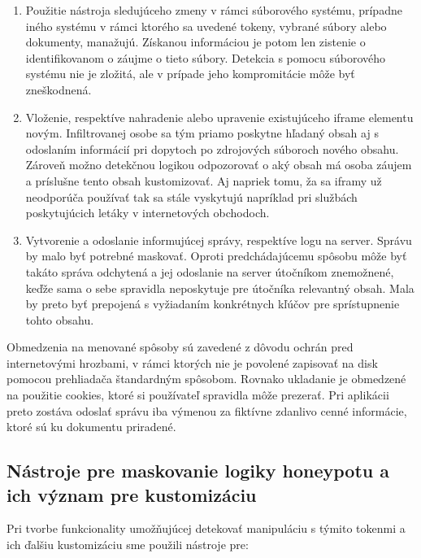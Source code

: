 \documentclass[conference, 11pt,slovak,a4paper,twoside]{IEEEtran}
\begin{document}
\begin{enumerate}
	\item Použitie nástroja sledujúceho zmeny v rámci súborového systému, prípadne iného systému v rámci ktorého sa uvedené tokeny, vybrané súbory alebo dokumenty, manažujú. Získanou informáciou je potom len zistenie o identifikovanom o záujme o tieto súbory. Detekcia s pomocu súborového systému nie je zložitá, ale v prípade jeho kompromitácie môže byť zneškodnená.
	
	\item Vloženie, respektíve nahradenie alebo upravenie existujúceho iframe elementu novým. Infiltrovanej osobe sa tým priamo poskytne hľadaný obsah aj s odoslaním informácií pri dopytoch po zdrojových súboroch nového obsahu. Zároveň možno detekčnou logikou odpozorovať o aký obsah má osoba záujem a príslušne tento obsah kustomizovať. Aj napriek tomu, ža sa iframy už neodporúča používať tak sa stále vyskytujú napríklad pri službách poskytujúcich letáky v internetových obchodoch.

	\item Vytvorenie a odoslanie informujúcej správy, respektíve logu na server. Správu by malo byť potrebné maskovať. Oproti predchádajúcemu spôsobu môže byť takáto správa odchytená a jej odoslanie na server útočníkom znemožnené, keďže sama o sebe spravidla neposkytuje pre útočníka relevantný obsah. Mala by preto byť prepojená s vyžiadaním konkrétnych kľúčov pre sprístupnenie tohto obsahu. 
\end{enumerate}
 
Obmedzenia na menované spôsoby sú zavedené z dôvodu ochrán pred internetovými hrozbami, v rámci ktorých nie je povolené zapisovať na disk pomocou prehliadača štandardným spôsobom. Rovnako ukladanie je obmedzené na použitie cookies, ktoré si používateľ spravidla môže prezerať. Pri aplikácii preto zostáva odoslať správu iba výmenou za fiktívne zdanlivo cenné informácie, ktoré sú ku dokumentu priradené.
  

\subsection{Nástroje pre maskovanie logiky honeypotu a ich význam pre kustomizáciu}

Pri tvorbe funkcionality umožňujúcej detekovať manipuláciu s týmito tokenmi a ich ďalšiu kustomizáciu sme použili nástroje pre:
\end{document}
